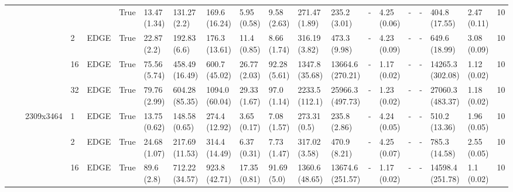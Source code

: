 \begin{tabular}{lllllllllllllllllllr}
                  &      &           &    &      & True &              13.47 (1.34) &                 131.27 (2.2) &                 169.6 (16.24) &                  5.95 (0.58) &           9.58 (2.63) &            271.47 (1.89) &              235.2 (3.01) &              - &              4.25 (0.06) &                - &             - &      404.8 (17.55) &          2.47 (0.11) &     10 \\
                  &      &           & 2  & EDGE & True &               22.87 (2.2) &                 192.83 (6.6) &                 176.3 (13.61) &                  11.4 (0.85) &           8.66 (1.74) &            316.19 (3.82) &              473.3 (9.98) &              - &              4.23 (0.09) &                - &             - &      649.6 (18.99) &          3.08 (0.09) &     10 \\
                  &      &           & 16 & EDGE & True &              75.56 (5.74) &               458.49 (16.49) &                 600.7 (45.02) &                 26.77 (2.03) &          92.28 (5.61) &           1347.8 (35.68) &          13664.6 (270.21) &              - &              1.17 (0.02) &                - &             - &   14265.3 (302.08) &          1.12 (0.02) &     10 \\
                  &      &           & 32 & EDGE & True &              79.76 (2.99) &               604.28 (85.35) &                1094.0 (60.04) &                 29.33 (1.67) &           97.0 (1.14) &           2233.5 (112.1) &          25966.3 (497.73) &              - &              1.23 (0.02) &                - &             - &   27060.3 (483.37) &          1.18 (0.02) &     10 \\
                  &      & 2309x3464 & 1  & EDGE & True &              13.75 (0.62) &                148.58 (0.65) &                 274.4 (12.92) &                  3.65 (0.17) &           7.08 (1.57) &             273.31 (0.5) &              235.8 (2.86) &              - &              4.24 (0.05) &                - &             - &      510.2 (13.36) &          1.96 (0.05) &     10 \\
                  &      &           & 2  & EDGE & True &              24.68 (1.07) &               217.69 (11.53) &                 314.4 (14.49) &                  6.37 (0.31) &           7.73 (1.47) &            317.02 (3.58) &              470.9 (8.21) &              - &              4.25 (0.07) &                - &             - &      785.3 (14.58) &          2.55 (0.05) &     10 \\
                  &      &           & 16 & EDGE & True &                89.6 (2.8) &               712.22 (34.57) &                 923.8 (42.71) &                 17.35 (0.81) &           91.69 (5.0) &           1360.6 (48.65) &          13674.6 (251.57) &              - &              1.17 (0.02) &                - &             - &   14598.4 (251.78) &           1.1 (0.02) &     10 \\

\end{tabular}
